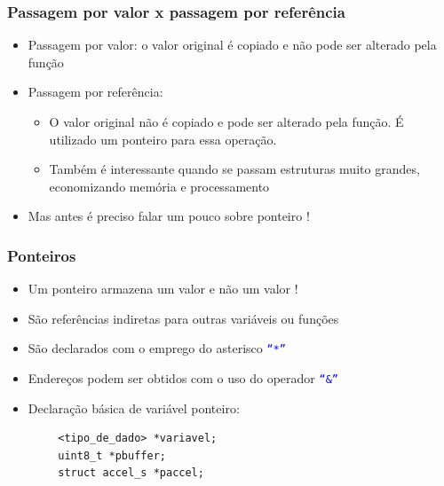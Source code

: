 \documentclass{beamer}
\begin{document}
\begin{frame}
\end{frame}

\begin{frame}
	\frametitle{Passagem por valor x passagem por referência}
	\begin{itemize}
		\item Passagem por valor: o valor original é copiado e não pode ser alterado pela função
		\item Passagem por referência:
		\begin{itemize}
			\item O valor original não é copiado e pode ser alterado pela função. É utilizado um ponteiro para essa operação.
			\item Também é interessante quando se passam estruturas muito grandes, economizando memória e processamento
		\end{itemize}
       \item Mas antes é preciso falar um pouco sobre ponteiro !
	\end{itemize}
\end{frame}

\begin{frame}[fragile]
	\frametitle{Ponteiros}
	\begin{itemize}
		\item Um ponteiro armazena um valor e não um valor !
		\item São referências indiretas para outras variáveis ou funções
		\item São declarados com o emprego do asterisco \texttt{\textcolor{blue}{``*''}}
		\item Endereços podem ser obtidos com o uso do operador \texttt{\textcolor{blue}{``\&''}}
		\item Declaração básica de variável ponteiro:
	\end{itemize}
	\begin{verbatim}
        <tipo_de_dado> *variavel;
        uint8_t *pbuffer;
        struct accel_s *paccel;
	\end{verbatim}
\end{frame}
\end{document}
